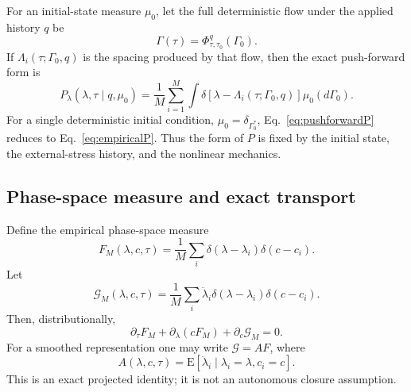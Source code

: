 \documentclass[11pt]{article}
\newcommand{\E}{\mathrm{E}}
\begin{document}
For an initial-state measure \(\mu_0\), let the full deterministic flow under the applied history \(q\) be
\begin{equation}
\Gamma(\tau)=\Phi^q_{\tau,\tau_0}(\Gamma_0).
\end{equation}
If \(\Lambda_i(\tau;\Gamma_0,q)\) is the spacing produced by that flow, then the exact push-forward form is
\begin{equation}
P_\lambda(\lambda,\tau\mid q,\mu_0)
=\frac1M\sum_{i=1}^{M}\int
\delta\!\left[\lambda-\Lambda_i(\tau;\Gamma_0,q)\right]\mu_0(d\Gamma_0).
\label{eq:pushforwardP}
\end{equation}
For a single deterministic initial condition, \(\mu_0=\delta_{\Gamma_0^*}\), Eq.~\eqref{eq:pushforwardP} reduces to Eq.~\eqref{eq:empiricalP}. Thus the form of \(P\) is fixed by the initial state, the external-stress history, and the nonlinear mechanics.

\subsection{Phase-space measure and exact transport}
Define the empirical phase-space measure
\begin{equation}
F_M(\lambda,c,\tau)
=\frac1M\sum_i
\delta(\lambda-\lambda_i)\delta(c-c_i).
\end{equation}
Let
\begin{equation}
\mathcal G_M(\lambda,c,\tau)
=\frac1M\sum_i\ddot\lambda_i
\delta(\lambda-\lambda_i)\delta(c-c_i).
\end{equation}
Then, distributionally,
\begin{equation}
\partial_\tau F_M+\partial_\lambda(cF_M)+\partial_c\mathcal G_M=0.
\label{eq:exacttransport}
\end{equation}
For a smoothed representation one may write \(\mathcal G=AF\), where
\begin{equation}
A(\lambda,c,\tau)=
\E[\ddot\lambda_i\mid \lambda_i=\lambda,c_i=c].
\end{equation}
This is an exact projected identity; it is not an autonomous closure assumption.
\end{document}
